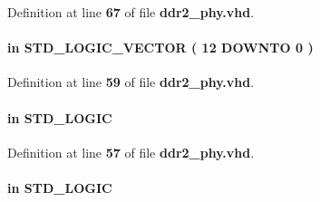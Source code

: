 Definition at line {\bf 67} of file {\bf ddr2\+\_\+phy.\+vhd}.

\paragraph[{dbg\+\_\+addr}]{ {\bfseries \textcolor{keywordflow}{in}\textcolor{vhdlchar}{ }} {\bfseries \textcolor{comment}{S\+T\+D\+\_\+\+L\+O\+G\+I\+C\+\_\+\+V\+E\+C\+T\+OR}\textcolor{vhdlchar}{ }\textcolor{vhdlchar}{(}\textcolor{vhdlchar}{ }\textcolor{vhdlchar}{ } \textcolor{vhdldigit}{12} \textcolor{vhdlchar}{ }\textcolor{keywordflow}{D\+O\+W\+N\+TO}\textcolor{vhdlchar}{ }\textcolor{vhdlchar}{ } \textcolor{vhdldigit}{0} \textcolor{vhdlchar}{ }\textcolor{vhdlchar}{)}\textcolor{vhdlchar}{ }} \hspace{0.3cm}{\ttfamily [Port]}}\label{classddr2__phy_a948aede450beb0d1555f623b301cff7a}


Definition at line {\bf 59} of file {\bf ddr2\+\_\+phy.\+vhd}.

\paragraph[{dbg\+\_\+clk}]{ {\bfseries \textcolor{keywordflow}{in}\textcolor{vhdlchar}{ }} {\bfseries \textcolor{comment}{S\+T\+D\+\_\+\+L\+O\+G\+IC}\textcolor{vhdlchar}{ }} \hspace{0.3cm}{\ttfamily [Port]}}\label{classddr2__phy_a5766261c1c78510e65bc9095c50ab4fb}


Definition at line {\bf 57} of file {\bf ddr2\+\_\+phy.\+vhd}.

\paragraph[{dbg\+\_\+cs}]{ {\bfseries \textcolor{keywordflow}{in}\textcolor{vhdlchar}{ }} {\bfseries \textcolor{comment}{S\+T\+D\+\_\+\+L\+O\+G\+IC}\textcolor{vhdlchar}{ }} \hspace{0.3cm}{\ttfamily [Port]}}\label{classddr2__phy_a1c7b076496ebf7f5ab718369cc4a65cc}


